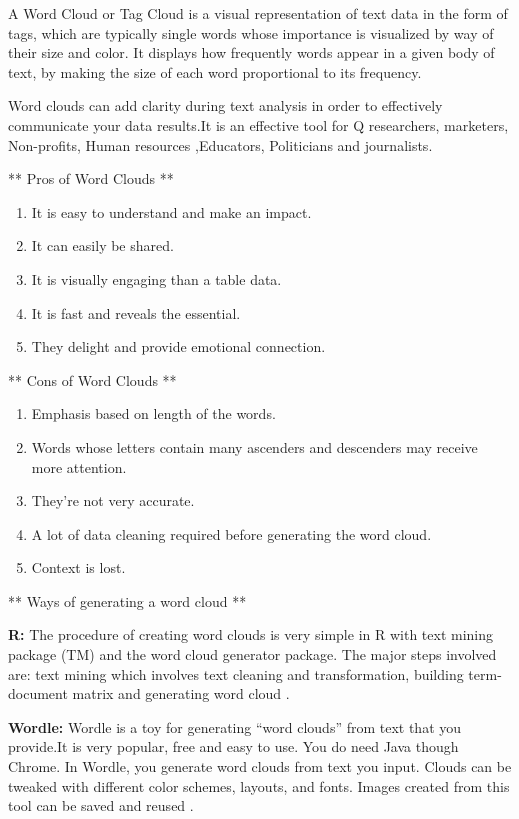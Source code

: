 \documentclass[]{book}
\providecommand{\tightlist}{%
  \setlength{\itemsep}{0pt}\setlength{\parskip}{0pt}}
\theoremstyle{definition}
\theoremstyle{definition}
\theoremstyle{definition}
\theoremstyle{remark}
\begin{document}
A Word Cloud or Tag Cloud is a visual representation of text data in the
form of tags, which are typically single words whose importance is
visualized by way of their size and color. It displays how frequently
words appear in a given body of text, by making the size of each word
proportional to its frequency.

Word clouds can add clarity during text analysis in order to effectively
communicate your data results.It is an effective tool for Q researchers,
marketers, Non-profits, Human resources ,Educators, Politicians and
journalists.

** Pros of Word Clouds **

\begin{enumerate}
\def\labelenumi{\arabic{enumi}.}
\tightlist
\item
  It is easy to understand and make an impact.
\item
  It can easily be shared.
\item
  It is visually engaging than a table data.
\item
  It is fast and reveals the essential.
\item
  They delight and provide emotional connection.
\end{enumerate}

** Cons of Word Clouds **

\begin{enumerate}
\def\labelenumi{\arabic{enumi}.}
\tightlist
\item
  Emphasis based on length of the words.
\item
  Words whose letters contain many ascenders and descenders may receive
  more attention.
\item
  They're not very accurate.
\item
  A lot of data cleaning required before generating the word cloud.
\item
  Context is lost.
\end{enumerate}

\citep{wordcloud}

** Ways of generating a word cloud **

\textbf{R:} The procedure of creating word clouds is very simple in R
with text mining package (TM) and the word cloud generator package. The
major steps involved are: text mining which involves text cleaning and
transformation, building term-document matrix and generating word cloud
\citep{r}.

\textbf{Wordle:} Wordle is a toy for generating ``word clouds'' from
text that you provide.It is very popular, free and easy to use. You do
need Java though Chrome. In Wordle, you generate word clouds from text
you input. Clouds can be tweaked with different color schemes, layouts,
and fonts. Images created from this tool can be saved and reused
\citep{wordle}.
\end{document}
